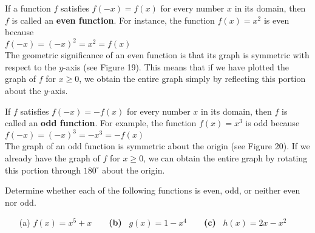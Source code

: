 \documentclass{sebase}
\begin{document}
If a function $f$ satisfies $f(-x)=f(x)$ for every number $x$ in its domain,
then $f$ is called an \textbf{even function}. For instance, the function $%
f(x)=x^{2}$ is even because 
\\[6pt]
\hspace*{\fill}$f(-x)=(-x)^{2}=x^{2}=f(x)$\hspace*{\fill}\\[6pt]
The geometric significance of an even function is that its graph is
symmetric with respect to the $y$-axis (see Figure 19). This means that if
we have plotted the graph of $f$ for $x\geq 0$, we obtain the entire graph
simply by reflecting this portion about the $y$-axis.

If $f$ satisfies $f(-x)=-f(x)$ for every number $x$ in its domain, then $f$
is called an \textbf{odd function}. For example, the function $f(x)=x^{3}$
is odd because\\[6pt]
\hspace*{\fill}$f(-x)=(-x)^{3}=-x^{3}=-f(x)$\hspace*{\fill}\\[6pt]
The graph of an odd function is symmetric about the origin (see Figure 20).
If we already have the graph of $f$ for $x\geq 0$, we can obtain the entire
graph by rotating this portion through $180^{\circ }$ about the origin.

\begin{Example}[11]
\VIDEO%
%
Determine whether each of the following functions is even, odd, or neither
even nor odd.

\begin{enumerate}
\item[(a)]
$f(x)=x^{5}+x\qquad $\textbf{(b)}~%
$g(x)=1-x^{4}\qquad $\textbf{(c)}~%
$h(x)=2x-x^{2}$
\end{enumerate}
\end{Example}
\end{document}
